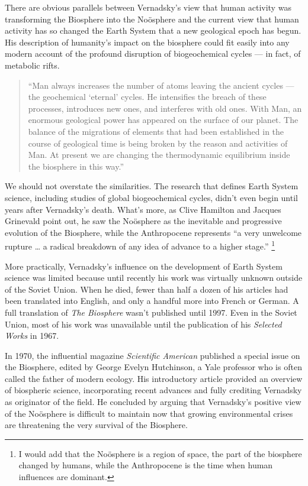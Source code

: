 \documentclass[11pt,a4paper]{article}
\begin{document}
There are obvious parallels between Vernadsky’s view that human activity was
transforming the Biosphere into the Noösphere and the current view that human
activity has so changed the Earth System that a new geological epoch has
begun.  His description of humanity’s impact on the biosphere could fit easily
into any modern account of the profound disruption of biogeochemical cycles —
in fact, of metabolic rifts.
\begin{quote}  
  “Man always increases the number of atoms leaving the ancient cycles — the
  geochemical ‘eternal’ cycles. He intensifies the breach of these processes,
  introduces new ones, and interferes with old ones. With Man, an enormous
  geological power has appeared on the surface of our planet. The balance of
  the migrations of elements that had been established in the course of
  geological time is being broken by the reason and activities of Man. At
  present we are changing the thermodynamic equilibrium inside the biosphere
  in this way.” \cite[p. 124]{11}
\end{quote}
We should not overstate the similarities. The research that defines Earth
System science, including studies of global biogeochemical cycles, didn’t even
begin until years after Vernadsky’s death. What’s more, as Clive Hamilton and
Jacques Grinevald point out, he saw the Noösphere as the inevitable and
progressive evolution of the Biosphere, while the Anthropocene represents “a
very unwelcome rupture … a radical breakdown of any idea of advance to a
higher stage.” \cite[p. 9]{25}\footnote{I would add that the Noösphere is a
  region of space, the part of the biosphere changed by humans, while the
  Anthropocene is the time when human influences are dominant.}

More practically, Vernadsky’s influence on the development of Earth System
science was limited because until recently his work was virtually unknown
outside of the Soviet Union. When he died, fewer than half a dozen of his
articles had been translated into English, and only a handful more into French
or German. A full translation of \emph{The Biosphere} wasn’t published until
1997. Even in the Soviet Union, most of his work was unavailable until the
publication of his \emph{Selected Works} in 1967.

In 1970, the influential magazine \emph{Scientific American} published a
special issue on the Biosphere, edited by George Evelyn Hutchinson, a Yale
professor who is often called the father of modern ecology. His introductory
article provided an overview of biospheric science, incorporating recent
advances and fully crediting Vernadsky as originator of the field. He
concluded by arguing that Vernadsky’s positive view of the Noösphere is
difficult to maintain now that growing environmental crises are threatening
the very survival of the Biosphere.
\end{document}
